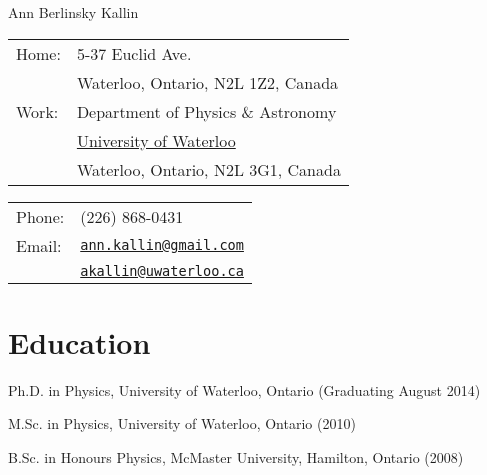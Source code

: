 \documentclass[letterpaper]{article}
\def\name{Ann Berlinsky Kallin}
\renewenvironment{itemize}{
  \begin{list}{}{
    \setlength{\leftmargin}{1.5em}
  }
}{
  \end{list}
}
\begin{document}
{\huge \name}


\vspace{0.25in}

\begin{minipage}[t]{0.5\linewidth}
 \begin{tabular}{ll}
   Home: & 5-37 Euclid Ave.\\
  \vspace{0.1in}
 & Waterloo, Ontario, N2L 1Z2, Canada\\ 
  Work: & Department of Physics \& Astronomy \\
  & \href{http://uwaterloo.ca/}{University of Waterloo} \\
  & Waterloo, Ontario, N2L 3G1, Canada
  \end{tabular}
\end{minipage}
\begin{minipage}[t]{0.45\linewidth}
  \begin{tabular}{ll}
  \vspace{0.1in}
    Phone: & (226) 868-0431 \\
    Email: & \href{mailto:ann.kallin@gmail.com}{\tt ann.kallin@gmail.com} \\
                & \href{mailto:akallin@uwaterloo.ca}{\tt akallin@uwaterloo.ca}
  \end{tabular}
\end{minipage}





\section*{Education}

\begin{itemize}
	\item Ph.D. in Physics, University of Waterloo, Ontario (Graduating August 2014)
  	\item M.Sc. in Physics, University of Waterloo, Ontario (2010)
	\item B.Sc. in Honours Physics, McMaster University, Hamilton, Ontario (2008)
\end{itemize}
\end{document}
